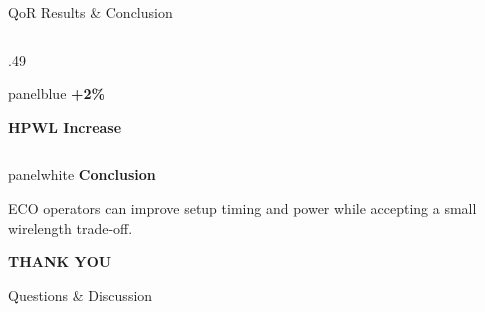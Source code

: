 \documentclass[aspectratio=169,10pt]{beamer}
\begin{document}
\begin{frame}{QoR Results \& Conclusion}
\begin{columns}[T,onlytextwidth]
\begin{column}{.49\textwidth}
      \vspace{.10cm}
      \begin{beamercolorbox}[rounded=true,sep=.14cm,wd=\linewidth]{panelblue}
        {\fontsize{24}{27}\selectfont\bfseries\color{Ink}+2\%}\par\vspace{.025cm}
        {\small\bfseries HPWL Increase}\par
      \end{beamercolorbox}
    \end{column}
  \end{columns}
  \vspace{.09cm}
  \begin{beamercolorbox}[rounded=true,sep=.13cm,wd=\linewidth]{panelwhite}
    {\small\bfseries\color{Accent}Conclusion}\par\vspace{.025cm}
    {\small\color{Ink}ECO operators can improve setup timing and power while accepting a small wirelength trade-off.}
  \end{beamercolorbox}
  \vspace{.06cm}
\end{frame}

{
\begin{frame}[plain]
  \centering
  \vfill
  {\fontsize{36}{42}\selectfont\bfseries\color{Ink}THANK YOU}\par
  \vspace{.37cm}
  {\fontsize{19}{24}\selectfont\color{Muted}Questions \& Discussion}\par
  \vfill
\end{frame}}
\end{document}
